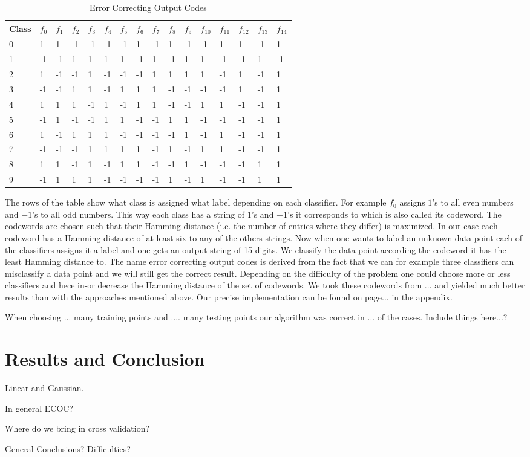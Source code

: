 \begin{table}[ht!]
	\centering
	\caption{Error Correcting Output Codes}
	\label{Codewords}
	\begin{tabular}{|l|l|l|l|l|l|l|l|l|l|l|l|l|l|l|l|}
		\hline
		Class	& $f_0$ & $f_1$ & $f_2$ & $f_3$ & $f_4$ & $f_5$ & $f_6$ & $f_7$ & $f_8$ & $f_9$ & $f_{10}$ & $f_{11}$ & $f_{12}$ & $f_{13}$ & $f_{14}$ \\ \hline \hline
		0	& 1 & 1 & -1 & -1 & -1 & -1 & 1 & -1 & 1 & -1 & -1 & 1 & 1 & -1 & 1 \\ \hline
		1	& -1 & -1 & 1 & 1 & 1 & 1 & -1 & 1 & -1 & 1 & 1 & -1 & -1 & 1 & -1 \\ \hline
		2	& 1 & -1 & -1 & 1 & -1 & -1 & -1 & 1 & 1 & 1 & 1 & -1 & 1 & -1 & 1 \\ \hline
		3	& -1 & -1 & 1 & 1 & -1 & 1 & 1 & 1 & -1 & -1 & -1 & -1 & 1 & -1 & 1 \\ \hline
		4	& 1 & 1 & 1 & -1 & 1 & -1 & 1 & 1 & -1 & -1 & 1 & 1 & -1 & -1 & 1 \\ \hline
		5	& -1 & 1 & -1 & -1 & 1 & 1 & -1 & -1 & 1 & 1 & -1 & -1 & -1 & -1 & 1 \\ \hline
		6	& 1 & -1 & 1 & 1 & 1 & -1 & -1 & -1 & -1 & 1 & -1 & 1 & -1 & -1 & 1 \\ \hline
		7	& -1 & -1 & -1 & 1 & 1 & 1 & 1 & -1 & 1 & -1 & 1 & 1 & -1 & -1 & 1 \\ \hline
		8	& 1 & 1 & -1 & 1 & -1 & 1 & 1 & -1 & -1 & 1 & -1 & -1 & -1 & 1 & 1 \\ \hline
		9	& -1 & 1 & 1 & 1 & -1 & -1 & -1 & -1 & 1 & -1 & 1 & -1 & -1 & 1 & 1 \\ \hline
	\end{tabular}
\end{table}  

The rows of the table show what class is assigned what label depending on each classifier. For example $f_0$ assigns $1$'s to all even numbers and $-1$'s to all odd numbers. This way each class has a string of $1$'s and $-1$'s it corresponds to which is also called its codeword. The codewords are chosen such that their Hamming distance (i.e. the number of entries where they differ) is maximized. In our case each codeword has a Hamming distance of at least six to any of the others strings. Now when one wants to label an unknown data point each of the classifiers assigns it a label and one gets an output string of 15 digits. We classify the data point according the codeword it has the least Hamming distance to. The name error correcting output codes is derived from the fact that we can for example three classifiers can misclassify a data point and we will still get the correct result. Depending on the difficulty of the problem one could choose more or less classifiers and hece in-or decrease the Hamming distance of the set of codewords. We took these codewords from ... and yielded much better results than with the approaches mentioned above. Our precise implementation can be found on page... in the appendix. 

When choosing ... many training points and .... many testing points our algorithm was correct in ... of the cases. Include things here...?


\chapter*{Results and Conclusion}
Linear and Gaussian.

In general ECOC?

Where do we bring in cross validation?

General Conclusions? Difficulties?
